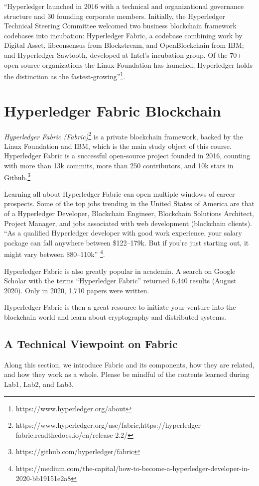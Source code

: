 \documentclass[12pt,a4paper]{article}
\theoremstyle{definition}
\begin{document}
``Hyperledger launched in 2016 with a technical and organizational governance structure and 30 founding corporate members. Initially, the Hyperledger Technical Steering Committee welcomed two business blockchain framework codebases into incubation: Hyperledger Fabric, a codebase combining work by Digital Asset, libconsensus from Blockstream, and OpenBlockchain from IBM; and Hyperledger Sawtooth, developed at Intel’s incubation group. Of the 70+ open source organizations the Linux Foundation has launched, Hyperledger holds the distinction as the fastest-growing''\footnote{https://www.hyperledger.org/about}.

\section{ Hyperledger Fabric Blockchain}
\emph{Hyperledger Fabric (Fabric)}\footnote{https://www.hyperledger.org/use/fabric,https://hyperledger-fabric.readthedocs.io/en/release-2.2/} \cite{fabric} is a private blockchain framework, backed by the Linux Foundation and IBM, which is the main study object of this course. Hyperledger Fabric is a successful open-source project founded in 2016, counting with more than 13k commits, more than 250 contributors, and 10k stars in Github.\footnote{https://github.com/hyperledger/fabric}

Learning all about Hyperledger Fabric can open multiple windows of career prospects. Some of the top jobs trending in the United States of America are that of a Hyperledger Developer, Blockchain Engineer, Blockchain Solutions Architect, Project Manager, and jobs associated with web development (blockchain clients). ``As a qualified Hyperledger developer with good work experience, your salary package can fall anywhere between \$122–179k. But if you’re just starting out, it might vary between \$80–110k'' \footnote{https://medium.com/the-capital/how-to-become-a-hyperledger-developer-in-2020-bb19151e2a8}.

Hyperledger Fabric is also greatly popular in academia. A search on Google Scholar with the terms ``Hyperledger Fabric'' returned 6,440 results (August 2020). Only in 2020, 1,710 papers were written.

Hyperledger Fabric is then a great resource to initiate your venture into the blockchain world and learn about cryptography and distributed systems.

\subsection{A Technical Viewpoint on Fabric}
Along this section, we introduce Fabric and its components, how they are related, and how they work as a whole. Please be mindful of the contents learned during Lab1, Lab2, and Lab3.
\end{document}
